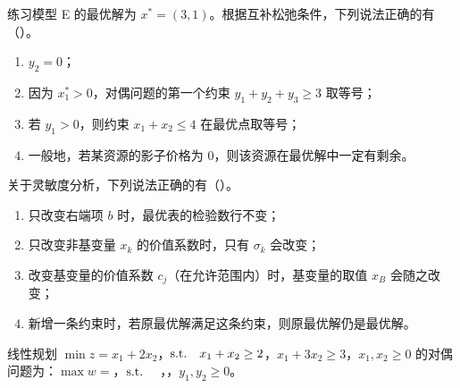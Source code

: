 \Q[\diff{基础·K4}] 练习模型 E 的最优解为 $x^*=(3,1)$。根据互补松弛条件，下列说法正确的有（\quad）。
\begin{figure}[!htbp]\centering
{}
\end{figure}
\begin{enumerate}[label=\Alph*.,leftmargin=2em]
  \item $y_2=0$；
  \item 因为 $x_1^*>0$，对偶问题的第一个约束 $y_1+y_2+y_3\ge3$ 取等号；
  \item 若 $y_1>0$，则约束 $x_1+x_2\le4$ 在最优点取等号；
  \item 一般地，若某资源的影子价格为 0，则该资源在最优解中一定有剩余。
\end{enumerate}

\Q[\diff{基础·K7/K8/K9}] 关于灵敏度分析，下列说法正确的有（\quad）。
\begin{enumerate}[label=\Alph*.,leftmargin=2em]
  \item 只改变右端项 $b$ 时，最优表的检验数行不变；
  \item 只改变非基变量 $x_k$ 的价值系数时，只有 $\sigma_k$ 会改变；
  \item 改变基变量的价值系数 $c_j$（在允许范围内）时，基变量的取值 $x_B$ 会随之改变；
  \item 新增一条约束时，若原最优解满足这条约束，则原最优解仍是最优解。
\end{enumerate}

\medskip
{}\noindent{}

\Q[\diff{基础·K2}] 线性规划 $\min z=x_1+2x_2$，$\text{s.t.}\quad x_1+x_2\ge2$，$x_1+3x_2\ge3$，$x_1,x_2\ge0$ 的对偶问题为：$\max w=$\underline{\hspace{2.5cm}}，$\text{s.t.}\quad$ \underline{\hspace{2.5cm}}，\underline{\hspace{2.5cm}}，$y_1,y_2\ge0$。
\begin{figure}[!htbp]\centering
{}
\end{figure}

